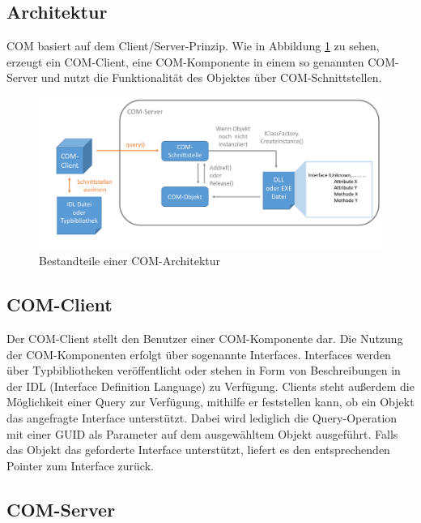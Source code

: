 \subsection{Architektur}
\label{ch:grundlagen:sec:ComponentObjectModel:subsec:Architektur}

COM basiert auf dem Client/Server-Prinzip. Wie in Abbildung \ref{GL_COM} zu sehen, erzeugt ein COM-Client, eine COM-Komponente in einem so genannten COM-Server und nutzt die Funktionalität des Objektes über COM-Schnittstellen. 

\begin{figure}[H]
	\centering
  \includegraphics[width=1.0\textwidth, width=1.0\textwidth]{pics/Grundlagen_com.pdf}
	\caption{Bestandteile einer COM-Architektur}
	\label{GL_COM}
\end{figure} 

\subsection{COM-Client}
\label{ch:grundlagen:sec:ComponentObjectModel:subsec:COMClient}

Der COM-Client stellt den Benutzer einer COM-Komponente dar. Die Nutzung der COM-Komponenten erfolgt über sogenannte Interfaces. Interfaces werden über Typbibliotheken veröffentlicht oder stehen in Form von Beschreibungen in der IDL (Interface Definition Language) zu Verfügung. Clients steht außerdem die Möglichkeit einer Query zur Verfügung, mithilfe er feststellen kann, ob ein Objekt das angefragte Interface unterstützt. Dabei wird lediglich die Query-Operation mit einer GUID als Parameter auf dem ausgewähltem Objekt ausgeführt. Falls das Objekt das geforderte Interface unterstützt, liefert es den entsprechenden Pointer zum Interface zurück.  

\subsection{COM-Server}
\label{ch:grundlagen:sec:ComponentObjectModel:subsec:COMServer}

